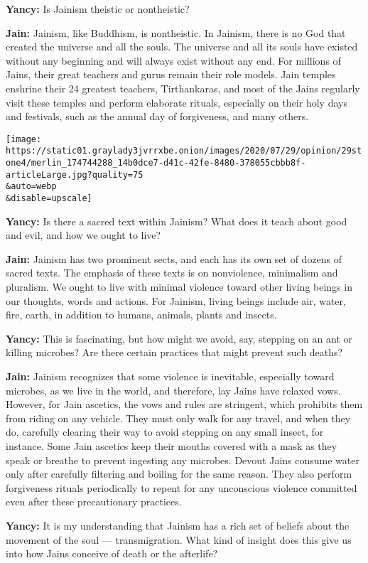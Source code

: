 \textbf{Yancy:} Is Jainism theistic or nontheistic?

\textbf{Jain:} Jainism, like Buddhism, is nontheistic. In Jainism, there
is no God that created the universe and all the souls. The universe and
all its souls have existed without any beginning and will always exist
without any end. For millions of Jains, their great teachers and gurus
remain their role models. Jain temples enshrine their 24 greatest
teachers, Tirthankaras, and most of the Jains regularly visit these
temples and perform elaborate rituals, especially on their holy days and
festivals, such as the annual day of forgiveness, and many others.

\texttt{[image: https://static01.graylady3jvrrxbe.onion/images/2020/07/29/opinion/29stone4/merlin\_174744288\_14b0dce7-d41c-42fe-8480-378055cbbb8f-articleLarge.jpg?quality=75\\\&auto=webp\\\&disable=upscale]}

\textbf{Yancy:} Is there a sacred text within Jainism? What does it
teach about good and evil, and how we ought to live?

\textbf{Jain:} Jainism has two prominent sects, and each has its own set
of dozens of sacred texts. The emphasis of these texts is on
nonviolence, minimalism and pluralism. We ought to live with minimal
violence toward other living beings in our thoughts, words and actions.
For Jainism, living beings include air, water, fire, earth, in addition
to humans, animals, plants and insects.

\textbf{Yancy:} This is fascinating, but how might we avoid, say,
stepping on an ant or killing microbes? Are there certain practices that
might prevent such deaths?

\textbf{Jain:} Jainism recognizes that some violence is inevitable,
especially toward microbes, as we live in the world, and therefore, lay
Jains have relaxed vows. However, for Jain ascetics, the vows and rules
are stringent, which prohibits them from riding on any vehicle. They
must only walk for any travel, and when they do, carefully clearing
their way to avoid stepping on any small insect, for instance. Some Jain
ascetics keep their mouths covered with a mask as they speak or breathe
to prevent ingesting any microbes. Devout Jains consume water only after
carefully filtering and boiling for the same reason. They also perform
forgiveness rituals periodically to repent for any unconscious violence
committed even after these precautionary practices.

\textbf{Yancy:} It is my understanding that Jainism has a rich set of
beliefs about the movement of the soul --- transmigration. What kind of
insight does this give us into how Jains conceive of death or the
afterlife?

